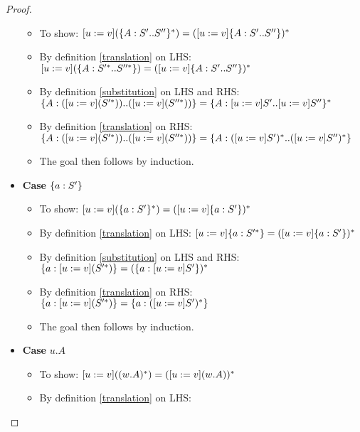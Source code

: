 \begin{proof}
\begin{itemize}
        \begin{itemize}
            \item To show: $[u := v](\{A : S' .. S''\}^{*}) =
                ([u := v]\{A : S' .. S''\})^{*}$
            \item By definition \ref{translation} on LHS:
                $[u := v](\{A : S'^{*} .. S''^{*}\}) =
                ([u := v]\{A : S' .. S''\})^{*}$
            \item By definition \ref{substitution} on LHS and RHS: \\
                $\{A : ([u := v](S'^{*})) .. ([u := v](S''^{*}))\}
                = \{A : [u := v]S' .. [u := v]S''\}^{*}$
            \item By definition \ref{translation} on RHS: \\
                $\{A : ([u := v](S'^{*})) .. ([u := v](S''^{*}))\}
                = \{A : ([u := v]S')^{*} .. ([u := v]S'')^{*}\}$
            \item The goal then follows by induction.
        \end{itemize}
        \item \textbf{Case} $\{a : S'\}$
        \begin{itemize}
            \item To show: $[u := v](\{a : S'\}^{*}) =
                ([u := v]\{a : S'\})^{*}$
            \item By definition \ref{translation} on LHS:
                $[u := v]\{a : S'^{*}\} = ([u := v]\{a : S'\})^{*}$
            \item By definition \ref{substitution} on LHS and RHS:
                $\{a : [u := v](S'^{*})\} =
                (\{a : [u := v]S'\})^{*}$
            \item By definition \ref{translation} on RHS:
                $\{a : [u := v](S'^{*})\} =
                \{a : ([u := v]S')^{*}\}$
            \item The goal then follows by induction.
        \end{itemize}
        \item \textbf{Case} $u.A$
        \begin{itemize}
            \item To show: $[u := v]((w.A)^{*}) =
                ([u := v](w.A))^{*}$
            \item By definition \ref{translation} on LHS:

\end{itemize}
\end{itemize}
\end{proof}
